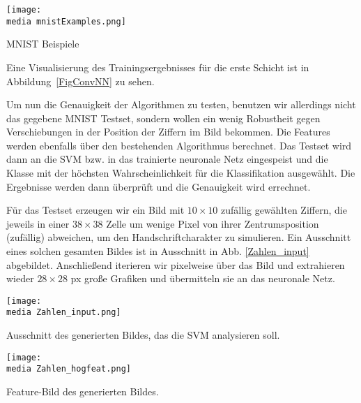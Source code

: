 \begin{dsafigure}
	\begin{center}
		\texttt{[image: \\media mnistExamples.png]}
		\caption{MNIST Beispiele}
		\label{FigConvNN}
	\end{center}
\end{dsafigure}

Eine Visualisierung des Trainingsergebnisses f\"ur die erste Schicht ist in Abbildung~\ref{FigConvNN} zu sehen.

Um nun die Genauigkeit der Algorithmen zu testen, benutzen wir allerdings nicht das gegebene MNIST Testset, sondern wollen ein wenig Robustheit gegen Verschiebungen in der Position der Ziffern im Bild bekommen. Die Features werden ebenfalls über den bestehenden Algorithmus berechnet. Das Testset wird dann an die SVM bzw. in das trainierte neuronale Netz eingespeist und die Klasse mit der h\"ochsten Wahrscheinlichkeit f\"ur die Klassifikation ausgew\"ahlt. Die Ergebnisse werden dann überprüft und die Genauigkeit wird errechnet.

F\"ur das Testset erzeugen wir ein Bild mit $10 \times 10$ zufällig gewählten Ziffern, die jeweils in einer $38 \times 38$ Zelle um wenige Pixel von ihrer Zentrumsposition (zuf\"allig) abweichen, um den Handschriftcharakter zu simulieren. Ein Ausschnitt eines solchen gesamten Bildes ist in Ausschnitt in Abb. \ref{Zahlen_input} abgebildet. Anschließend iterieren wir pixelweise über das Bild und extrahieren wieder $28 \times 28$ px große Grafiken und übermitteln sie an das neuronale Netz.

\begin{dsafigure}
\begin{center}
	\texttt{[image: \\media Zahlen\_input.png]}
	\caption{Ausschnitt des generierten Bildes, das die SVM analysieren soll.}
	\label{Zahlen_input}
\end{center}
\end{dsafigure}

\begin{dsafigure}
\begin{center}
	\texttt{[image: \\media Zahlen\_hogfeat.png]}
	\caption{Feature-Bild des generierten Bildes.}
	\label{Zahlen_hogfeat}
\end{center}
\end{dsafigure}

